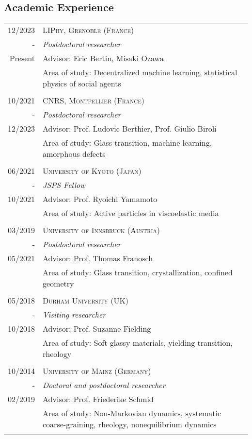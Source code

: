 \subsection*{Academic Experience}
\begin{tabular}{r|p{13cm}}
	\textsc{12/2023  }& \textsc{LIPhy, Grenoble (France) } \\-&\emph{Postdoctoral researcher}\\
	Present&\footnotesize{Advisor: Eric Bertin, Misaki Ozawa}\\
	&\footnotesize{Area of study: Decentralized machine learning, statistical physics of social agents}\\		\multicolumn{2}{c}{}\\
		\textsc{10/2021  }& \textsc{CNRS, Montpellier (France) } \\-&\emph{Postdoctoral researcher}\\
	12/2023&\footnotesize{Advisor: Prof. Ludovic Berthier, Prof. Giulio Biroli}\\
	&\footnotesize{Area of study: Glass transition, machine learning, amorphous defects}\\
		\multicolumn{2}{c}{}\\
		\textsc{06/2021  }& \textsc{University of Kyoto (Japan) } \\-&\emph{JSPS Fellow}\\
	\textsc{10/2021  }&\footnotesize{Advisor: Prof. Ryoichi Yamamoto}\\
	&\footnotesize{Area of study: Active particles in viscoelastic media}\\
		\multicolumn{2}{c}{}\\
	\textsc{03/2019  }& \textsc{University of Innsbruck (Austria) } \\-&\emph{Postdoctoral researcher}\\
	\textsc{05/2021}&\footnotesize{Advisor: Prof. Thomas Franosch}\\
	&\footnotesize{Area of study: Glass transition, crystallization, confined geometry}\\
	\multicolumn{2}{c}{}\\
	
		\textsc{05/2018  }& \textsc{Durham University (UK)} \\\textsc{}-&\emph{Visiting researcher}\\10/2018&\footnotesize{  Advisor: Prof. Suzanne Fielding }\\
	&\footnotesize{Area of study: Soft glassy materials, yielding transition, rheology}\\
	\multicolumn{2}{c}{}\\
	
	\textsc{10/2014 }& \textsc{University of Mainz (Germany) } \\\textsc{}-&\emph{Doctoral and postdoctoral researcher}\\02/2019 &\footnotesize{Advisor: Prof. Friederike Schmid}
	\\&\footnotesize{Area of study: Non-Markovian dynamics, systematic coarse-graining, rheology, nonequilibrium
		dynamics}
	\\\multicolumn{2}{c}{}
	

	
\end{tabular}

